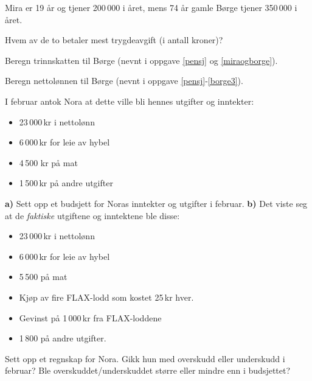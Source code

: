 Mira er 19 år og tjener 200\,000 i året, mens 74 år gamle Børge tjener 350\,000 i året. \os

Hvem av de to betaler mest trygdeavgift (i antall kroner)?

Beregn trinnskatten til Børge (nevnt i oppgave \ref{pensj} og \ref{miraogborge}).

Beregn nettolønnen til Børge (nevnt i oppgave \ref{pensj}-\ref{borge3}).

\nes

I februar antok Nora at dette ville bli hennes utgifter og inntekter:
\begin{itemize}
	\item 23\,000\,kr i nettolønn 
	\item 6\,000\,kr for leie av hybel
	\item 4\,500 kr på mat
	\item 1\,500\,kr på andre utgifter
\end{itemize}
\textbf{a)} Sett opp et budsjett for Noras inntekter og utgifter i februar.\os
\textbf{b)} Det viste seg at de \textsl{faktiske} utgiftene og inntektene ble disse:
\begin{itemize}
	\item 23\,000\,kr i nettolønn
	\item 6\,000\,kr for leie av hybel
	\item 5\,500 på mat
	\item Kjøp av fire FLAX-lodd som kostet 25\,kr hver.
	\item Gevinst på 1\,000\,kr fra FLAX-loddene
	\item 1\,800 på andre utgifter.
\end{itemize}
Sett opp et regnskap for Nora. Gikk hun med overskudd eller underskudd i februar? Ble overskuddet/underskuddet større eller mindre enn i budsjettet?



